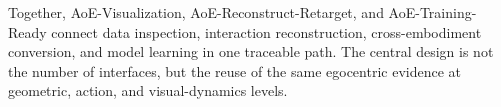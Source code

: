 Together, AoE-Visualization, AoE-Reconstruct-Retarget, and AoE-Training-Ready connect data inspection, interaction reconstruction, cross-embodiment conversion, and model learning in one traceable path.
The central design is not the number of interfaces, but the reuse of the same egocentric evidence at geometric, action, and visual-dynamics levels.
